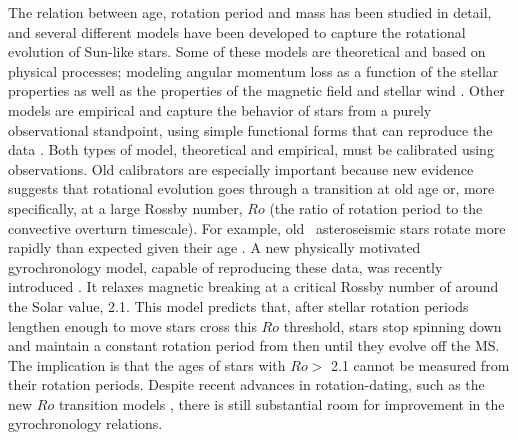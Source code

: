 
The relation between age, rotation period and mass has been studied in detail,
and several different models have been developed to capture the rotational
evolution of Sun-like stars.
Some of these models are theoretical and based on physical processes; modeling
angular momentum loss as a function of the stellar properties as well as the
properties of the magnetic field and stellar wind \citep{kawaler1988,
kawaler1989, vansaders2013, matt2015, vansaders2016}.
Other models are empirical and capture the behavior of stars from a purely
observational standpoint, using simple functional forms that can reproduce the
data \citep{barnes2003, barnes2007, mamajek2008, angus2015}.
Both types of model, theoretical and empirical, must be calibrated using
observations.
Old calibrators are especially important because new evidence suggests that
rotational evolution goes through a transition at old age or, more
specifically, at a large Rossby number, $Ro$ (the ratio of rotation period to
the convective overturn timescale).
For example, old \kepler\ asteroseismic stars rotate more rapidly than
expected given their age \citep[\eg][]{angus2015, vansaders2016}.
A new physically motivated gyrochronology model, capable of reproducing these
data, was recently introduced \citep{vansaders2016}.
It relaxes magnetic breaking at a critical Rossby number of around the Solar
value, 2.1.
This model predicts that, after stellar rotation periods lengthen enough to
move stars cross this $Ro$ threshold, stars stop spinning down and maintain a
constant rotation period from then until they evolve off the MS.
The implication is that the ages of stars with $Ro >$ 2.1 cannot be measured
from their rotation periods.
Despite recent advances in rotation-dating, such as the new $Ro$ transition
models \citep{vansaders2016, vansaders2018}, there is still substantial room
for improvement in the gyrochronology relations.

